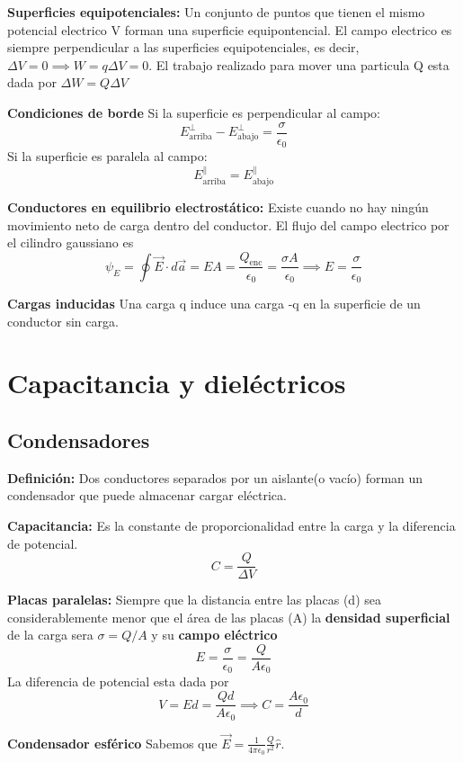 \documentclass[a4paper, 10pt]{article}
\begin{document}
\begin{multicols*}{2}
	\textbf{Superficies equipotenciales: }Un conjunto de puntos que tienen el mismo potencial electrico V forman una superficie equipontencial. El campo electrico es siempre perpendicular a las superficies equipotenciales, es decir, $\Delta V=0 \implies W=q \Delta V=0$. El trabajo realizado para mover una particula Q esta dada por $\Delta W = Q \Delta V$
	    
	\textbf{Condiciones de borde}
	Si la superficie es perpendicular al campo:
	$$E_{\text{arriba}}^{\perp} - E _{\text{abajo}}^{\perp}=\frac{\sigma}{\epsilon_0}$$
	Si la superficie es paralela al campo:
	$$E_{\text{arriba}}^{\parallel}=E_{\text{abajo}}^{\parallel}$$
	    
	\textbf{Conductores en equilibrio electrostático:} Existe cuando no hay ningún movimiento neto de carga dentro del conductor.
	El flujo del campo electrico por el cilindro gaussiano es 
	$$\psi _E = \oint\vec{E}\cdot d\vec{a}=EA=\frac{Q_{\text{enc}}}{\epsilon_0}=\frac{\sigma A}{\epsilon_0} \implies E=\frac{\sigma}{\epsilon_0}$$
	    
	\textbf{Cargas inducidas}
	Una carga q induce una carga -q en la superficie de un conductor sin carga.
	    
	    
	    
	\section{Capacitancia y dieléctricos}
	\subsection*{Condensadores}
	\textbf{Definición:} Dos conductores separados por un aislante(o vacío) forman un condensador que puede almacenar cargar eléctrica.
	    
	\textbf{Capacitancia:} Es la constante de proporcionalidad entre la carga y la diferencia de potencial. $$C = \frac{Q}{\Delta V}$$
	    
	\textbf{Placas paralelas:} Siempre que la distancia entre las placas (d) sea considerablemente menor que el área de las placas (A) la \textbf{densidad superficial} de la carga sera $ \sigma = Q/A $ y su \textbf{campo eléctrico} $$E = \frac{\sigma}{\epsilon_0} = \frac{Q}{A \epsilon_0}$$
	La diferencia de potencial esta dada por 
  $$ V = Ed = \frac{Qd}{A\epsilon_0} \implies C = \frac{A\epsilon_0}{d}$$ 
	    
	\textbf{Condensador esférico}
	Sabemos que $\vec{E} = \frac{1}{4 \pi \epsilon_0} \frac{Q}{r^2}\hat{r}$.


\end{multicols*}
\end{document}
